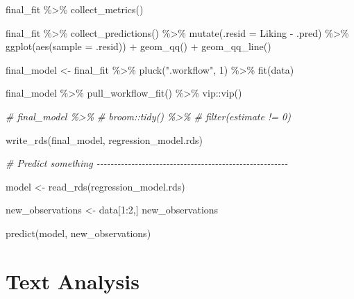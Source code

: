 \documentclass[
]{book}
\newenvironment{Shaded}{\begin{snugshade}}{\end{snugshade}}
\newcommand{\AttributeTok}[1]{\textcolor[rgb]{0.77,0.63,0.00}{#1}}
\newcommand{\CommentTok}[1]{\textcolor[rgb]{0.56,0.35,0.01}{\textit{#1}}}
\newcommand{\DecValTok}[1]{\textcolor[rgb]{0.00,0.00,0.81}{#1}}
\newcommand{\FunctionTok}[1]{\textcolor[rgb]{0.00,0.00,0.00}{#1}}
\newcommand{\NormalTok}[1]{#1}
\newcommand{\OtherTok}[1]{\textcolor[rgb]{0.56,0.35,0.01}{#1}}
\newcommand{\SpecialCharTok}[1]{\textcolor[rgb]{0.00,0.00,0.00}{#1}}
\newcommand{\StringTok}[1]{\textcolor[rgb]{0.31,0.60,0.02}{#1}}
\begin{document}
\begin{Shaded}
\begin{Highlighting}[]
\NormalTok{final\_fit }\SpecialCharTok{\%\textgreater{}\%} \FunctionTok{collect\_metrics}\NormalTok{()}

\NormalTok{final\_fit }\SpecialCharTok{\%\textgreater{}\%}
  \FunctionTok{collect\_predictions}\NormalTok{() }\SpecialCharTok{\%\textgreater{}\%}
  \FunctionTok{mutate}\NormalTok{(}\AttributeTok{.resid =}\NormalTok{ Liking }\SpecialCharTok{{-}}\NormalTok{ .pred) }\SpecialCharTok{\%\textgreater{}\%}
  \FunctionTok{ggplot}\NormalTok{(}\FunctionTok{aes}\NormalTok{(}\AttributeTok{sample =}\NormalTok{ .resid)) }\SpecialCharTok{+}
  \FunctionTok{geom\_qq}\NormalTok{() }\SpecialCharTok{+}
  \FunctionTok{geom\_qq\_line}\NormalTok{()}

\NormalTok{final\_model }\OtherTok{\textless{}{-}}\NormalTok{  final\_fit }\SpecialCharTok{\%\textgreater{}\%}
  \FunctionTok{pluck}\NormalTok{(}\StringTok{".workflow"}\NormalTok{, }\DecValTok{1}\NormalTok{) }\SpecialCharTok{\%\textgreater{}\%}
  \FunctionTok{fit}\NormalTok{(data)}

\NormalTok{final\_model }\SpecialCharTok{\%\textgreater{}\%}
  \FunctionTok{pull\_workflow\_fit}\NormalTok{() }\SpecialCharTok{\%\textgreater{}\%}
\NormalTok{  vip}\SpecialCharTok{::}\FunctionTok{vip}\NormalTok{()}

\CommentTok{\# final\_model \%\textgreater{}\%}
\CommentTok{\#   broom::tidy() \%\textgreater{}\%}
\CommentTok{\#   filter(estimate != 0)}

\FunctionTok{write\_rds}\NormalTok{(final\_model, }\StringTok{\textquotesingle{}regression\_model.rds\textquotesingle{}}\NormalTok{)}

\CommentTok{\# Predict something {-}{-}{-}{-}{-}{-}{-}{-}{-}{-}{-}{-}{-}{-}{-}{-}{-}{-}{-}{-}{-}{-}{-}{-}{-}{-}{-}{-}{-}{-}{-}{-}{-}{-}{-}{-}{-}{-}{-}{-}{-}{-}{-}{-}{-}{-}{-}{-}{-}{-}{-}{-}{-}{-}{-}}

\NormalTok{model }\OtherTok{\textless{}{-}} \FunctionTok{read\_rds}\NormalTok{(}\StringTok{\textquotesingle{}regression\_model.rds\textquotesingle{}}\NormalTok{)}

\NormalTok{new\_observations }\OtherTok{\textless{}{-}}\NormalTok{ data[}\DecValTok{1}\SpecialCharTok{:}\DecValTok{2}\NormalTok{,]}
\NormalTok{new\_observations}

\FunctionTok{predict}\NormalTok{(model, new\_observations)}
\end{Highlighting}
\end{Shaded}

\hypertarget{text_analysis}{%
\chapter{Text Analysis}\label{text_analysis}}
\end{document}
